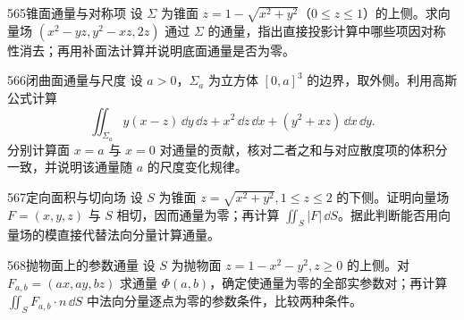 \begin{exercise}{565}{锥面通量与对称项}
设 $\Sigma$ 为锥面 $z=1-\sqrt{x^2+y^2}$（$0\le z\le1$）的上侧。求向量场 $(x^2-yz,y^2-xz,2z)$ 通过 $\Sigma$ 的通量，指出直接投影计算中哪些项因对称性消去；再用补面法计算并说明底面通量是否为零。
\end{exercise}
\begin{exercise}{566}{闭曲面通量与尺度}
设 $a>0$，$\Sigma_a$ 为立方体 $[0,a]^3$ 的边界，取外侧。利用高斯公式计算
\[\iint_{\Sigma_a}y(x-z)\,\dd y\,\dd z+x^2\,\dd z\,\dd x+(y^2+xz)\,\dd x\,\dd y.\]
分别计算面 $x=a$ 与 $x=0$ 对通量的贡献，核对二者之和与对应散度项的体积分一致，并说明该通量随 $a$ 的尺度变化规律。
\end{exercise}
\begin{exercise}{567}{定向面积与切向场}
设 $S$ 为锥面 $z=\sqrt{x^2+y^2},1\le z\le2$ 的下侧。证明向量场 $F=(x,y,z)$ 与 $S$ 相切，因而通量为零；再计算 $\iint_S|F|\,\dd S$。据此判断能否用向量场的模直接代替法向分量计算通量。
\end{exercise}
\begin{exercise}{568}{抛物面上的参数通量}
设 $S$ 为抛物面 $z=1-x^2-y^2,z\ge0$ 的上侧。对 $F_{a,b}=(ax,ay,bz)$ 求通量 $\Phi(a,b)$，确定使通量为零的全部实参数对；再计算 $\iint_SF_{a,b}\cdot n\,\dd S$ 中法向分量逐点为零的参数条件，比较两种条件。
\end{exercise}
